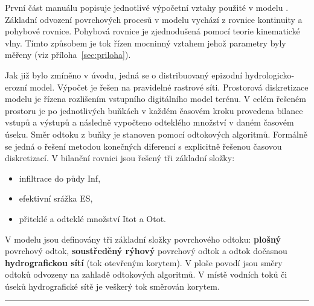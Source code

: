 %

První část manuálu popisuje jednotlivé výpočetní vztahy použité v modelu \smod. Základní odvození povrchových procesů v modelu \smod vychází z rovnice kontinuity a pohybové rovnice. Pohybová rovnice je zjednodušená pomocí teorie kinematické vlny. Tímto způsobem je tok řízen mocninný vztahem jehož parametry byly měřeny (viz  příloha~\ref{sec:priloha}). 

Jak již bylo zmíněno v úvodu, jedná se o distribuovaný epizodní hydrologicko-erozní model. Výpočet je řešen na pravidelné rastrové síti. Prostorová diskretizace modelu je řízena  rozlišením vstupního digitálního model terénu. V celém řešeném prostoru je po jednotlivých buňkách v každém časovém kroku provedena bilance vstupů a výstupů a následně vypočteno odteklého množství v daném časovém úseku. Směr odtoku z buňky je stanoven pomocí odtokových algoritmů. Formálně se jedná o řešení metodou konečných diferencí s explicitně řešenou časovou diskretizací. V bilanční rovnici jsou řešený tři základní složky:


\begin{itemize}\itemsep 0cm
\item infiltrace do půdy \acs{Inf},
\item efektivní srážka \acs{ES},
\item přiteklé a odteklé množství \acs{Itot} a \acs{Otot}.
\end{itemize}


V modelu jsou definovány tři základní složky povrchového odtoku: \textbf{plošný} povrchový odtok, \textbf{soustředěný rýhový}  povrchový odtok a odtok dočasnou \textbf{hydrografickou sítí} (tok otevřeným korytem). V ploše povodí jsou směry odtoků odvozeny na zahladě odtokových algoritmů. V místě vodních toků či úseků hydrografické sítě je veškerý tok směrován korytem.\\
% 
% 
\rule{\textwidth}{0.3pt}



